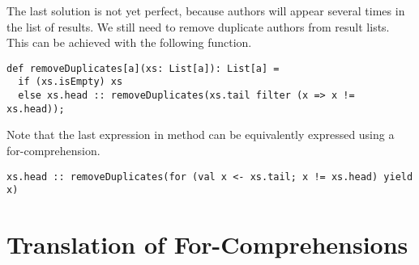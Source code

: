The last solution is not yet perfect, because authors will appear
several times in the list of results.  We still need to remove
duplicate authors from result lists.  This can be achieved with the
following function.
\begin{lstlisting}
def removeDuplicates[a](xs: List[a]): List[a] =
  if (xs.isEmpty) xs
  else xs.head :: removeDuplicates(xs.tail filter (x => x != xs.head));
\end{lstlisting}
Note that the last expression in method 
can be equivalently expressed using a for-comprehension.
\begin{lstlisting}
xs.head :: removeDuplicates(for (val x <- xs.tail; x != xs.head) yield x)
\end{lstlisting}

\section{Translation of For-Comprehensions}

